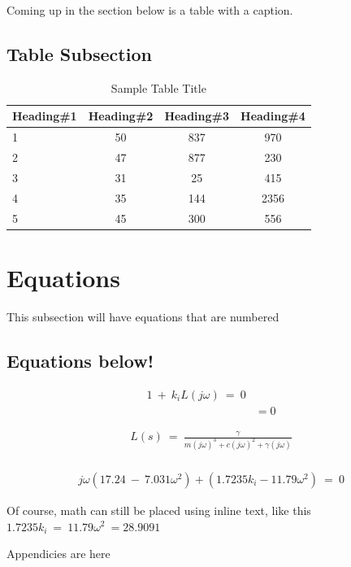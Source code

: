 \documentclass[12pt]{article} %
\begin{document}
Coming up in the section below is a table with a caption.

\subsection{Table Subsection}

\begin{table}[ht]
\caption{Sample Table Title} %
\centering %
\begin{tabular}{l | c c c} %
\hline\hline %
Heading\#1 & Heading\#2 & Heading\#3 & Heading\#4 \\ [0.5ex] %
\hline %
1 & 50 & 837 & 970 \\ %
2 & 47 & 877 & 230 \\
3 & 31 & 25 & 415 \\
4 & 35 & 144 & 2356 \\
5 & 45 & 300 & 556 \\ [1ex] %
\hline %
\end{tabular}
\label{table:nonlin} %
\end{table}

\clearpage

\section{Equations}

This subsection will have equations that are numbered

\subsection{Equations below!}

\begin{align}
1\:+\:k_iL\left(j\omega \right)\:=\:0\\
                          &= 0
\end{align} 

\begin{align}
L\left(s\right)\:=\:\frac{\gamma }{m\left(j\omega \right)^3+c\left(j\omega \right)^2+\gamma \left(j\omega \right)}\nonumber\\
\end{align}

\begin{align*}
j\omega \left(17.24\:-\:7.031\omega^2\right)+\left(1.7235k_i-11.79\omega ^2\right)\:=\:0
\end{align*} 

Of course, math can still be placed using inline text, like this $1.7235k_i\:=\:11.79\omega ^2\:=28.9091$

\clearpage

\appendixpage
\appendix

Appendicies are here
\end{document}
